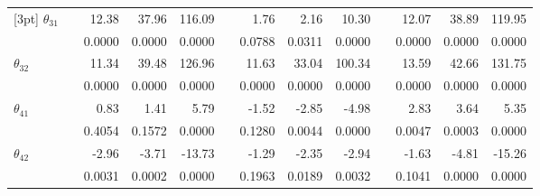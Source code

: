 \documentclass[number,citesort,seceqn,dvips]{arxbj}
\begin{document}
\begin{table}
{{\begin{tabular*}{\textwidth}{@{\extracolsep{\fill}}l@{}c@{}d{3.4}d{4.4}d{4.4}@{}c@{}d{3.4}d{4.4}d{4.4}@{}c@{}d{3.4}d{4.4}d{4.4}@{}}
[3pt]
$\theta_{31}$ && 12.38 &37.96 &116.09 && 1.76& 2.16 &10.30 && 12.07& 38.89&
119.95 \\
&& 0.0000& 0.0000 &0.0000 && 0.0788& 0.0311 &0.0000 && 0.0000 &0.0000& 0.0000 \\
[3pt]
$\theta_{32}$ && 11.34 &39.48& 126.96 && 11.63& 33.04 &100.34 && 13.59 &42.66&
131.75 \\
&& 0.0000 &0.0000& 0.0000 && 0.0000& 0.0000& 0.0000 && 0.0000& 0.0000 &0.0000 \\
[3pt]
$\theta_{41}$ && 0.83& 1.41& 5.79 && -1.52& -2.85& -4.98 && 2.83 &3.64& 5.35 \\
&& 0.4054 &0.1572 &0.0000 && 0.1280 &0.0044& 0.0000 && 0.0047 &0.0003& 0.0000 \\
[3pt]
$\theta_{42}$ && -2.96 &-3.71& -13.73 && -1.29 &-2.35 &-2.94 && -1.63 &-4.81&
-15.26 \\
&& 0.0031 &0.0002 &0.0000 && 0.1963 &0.0189& 0.0032 && 0.1041& 0.0000 &0.0000 \\
\hline
\end{tabular*}}}
\vspace*{3pt}
%
\end{table}
%
\end{document}
